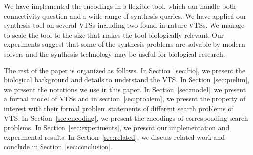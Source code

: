 \par We have implemented the encodings in a flexible tool, which can handle both connectivity question and a wide range of synthesis queries. 
%
We have applied our synthesis tool on several VTSs including
two found-in-nature VTSs.
%
We manage to scale the tool to the size that makes the tool biologically relevant. 
%
Our experiments suggest that some of the synthesis problems are solvable by modern solvers and the synthesis technology may be useful for biological research.
%

%
The rest of the paper is organized as follows. 
%
In Section~\ref{sec:bio}, we present the biological background and details to understand the VTS. 
%
In Section~\ref{sec:prelim}, we present the notations we use in this paper. 
%
In Section~\ref{sec:model}, we present a formal model of VTSs and in section~\ref{sec:problem}, we present the property of interest with their formal problem statements of different search problems of VTS.
%
In Section~\ref{sec:encoding}, we present the encodings of corresponding search problems. 
%
In Section~\ref{sec:experiments}, we present our implementation and experimental results. 
%
In Section~\ref{sec:related}, we discuss related work and conclude in Section~\ref{sec:conclusion}.
%
~        
